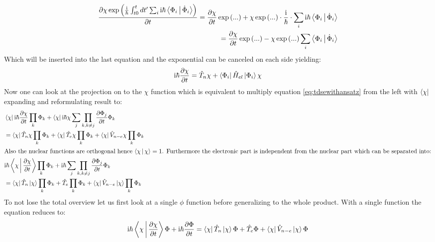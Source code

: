 \documentclass[12pt]{scrartcl}
\begin{document}
\begin{align*}
\frac{\partial \chi \exp\left( \frac{\mathrm{i}}{\hbar} \int_{t0}^{t}dt'\sum_{i}\mathrm{i}\hbar\Braket{\Phi_i|\dot{\Phi}_i} \right)}{\partial t} = \frac{\partial \chi}{\partial t}\exp\left(...\right) + \chi\exp\left(...\right) \cdot \frac{\mathrm{i}}{\hbar} \cdot \sum_{i}\mathrm{i}\hbar\Braket{\Phi_i|\dot{\Phi}_i}\\
=\frac{\partial \chi}{\partial t}\exp\left(...\right) - \chi\exp\left(...\right) \sum_{i}\Braket{\Phi_i|\dot{\Phi}_i}
\end{align*}
Which will be inserted into the last equation and the exponential can be canceled on each side yielding:
\begin{equation}
\mathrm{i}\hbar \frac{\partial \chi}{\partial t} = \hat{T}_n\chi+  \Bra{\Phi_i} \hat{H}_{el}\Ket{\Phi_i} \chi
\label{eqfornuclearpart}
\end{equation}
Now one can look at the projection on to the $\chi$ function which is equivalent to multiply equation \ref{eq:tdsewithansatz} from the left with $\Bra{\chi}$ expanding and reformulating result to:
\begin{align*}
&\Bra{\chi}\mathrm{i}\hbar \frac{\partial \chi}{\partial t} \prod_{k} \Phi_k + \Bra{\chi} \mathrm{i}\hbar \chi \sum_{j}\prod_{k,k \neq j} \frac{\partial\Phi_j}{\partial t}\Phi_k \\ &= \Bra{\chi} \hat{T}_n \chi \prod_{k} \Phi_k + \Bra{\chi} \hat{T}_e \chi \prod_{k} \Phi_k + \Bra{\chi} \hat{V}_{n-e} \chi \prod_{k} \Phi_k\\
\intertext{Also the nuclear functions are orthogonal hence $\Braket{\chi | \chi}=1$. Furthermore the electronic part is independent from the nuclear part which can be separated into:}
&\mathrm{i}\hbar \Braket{\chi|\frac{\partial \chi}{\partial t}} \prod_{k} \Phi_k + \mathrm{i}\hbar \sum_{j}\prod_{k,k \neq j} \frac{\partial\Phi_j}{\partial t}\Phi_k \\&= \Bra{\chi}\hat{T}_n\Ket{\chi} \prod_{k} \Phi_k + \hat{T}_e \prod_{k} \Phi_k + \Bra{\chi} \hat{V}_{n-e} \Ket{\chi} \prod_{k} \Phi_k
\end{align*}
To not lose the total overview let us first look at a single $\phi$ function before generalizing to the whole product. With a single function the equation reduces to:
\begin{align*}
\mathrm{i}\hbar \Braket{\chi|\frac{\partial \chi}{\partial t}} \Phi + \mathrm{i}\hbar \frac{\partial\Phi}{\partial t} = \Bra{\chi}\hat{T}_n\Ket{\chi} \Phi + \hat{T}_e \Phi + \Bra{\chi} \hat{V}_{n-e} \Ket{\chi} \Phi
\end{align*}
\end{document}
